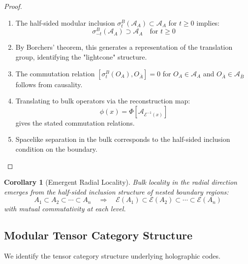 \documentclass[12pt,a4paper]{article}
\newtheorem{corollary}[theorem]{Corollary}
\begin{document}
\begin{proof}
\begin{enumerate}
    \item The half-sided modular inclusion $\sigma_t^B(\mathcal{A}_A) \subset \mathcal{A}_A$ for $t \geq 0$ implies:
    \begin{equation}
    \sigma_{-t}^B(\mathcal{A}_A) \supset \mathcal{A}_A \quad \text{for } t \geq 0
    \end{equation}
    
    \item By Borchers' theorem, this generates a representation of the translation group, identifying the "lightcone" structure.
    
    \item The commutation relation $[\sigma_t^B(O_A), O_{\bar{A}}] = 0$ for $O_A \in \mathcal{A}_A$ and $O_{\bar{A}} \in \mathcal{A}_{\bar{B}}$ follows from causality.
    
    \item Translating to bulk operators via the reconstruction map:
    \begin{equation}
    \phi(x) = \Phi[\mathcal{A}_{\mathcal{E}^{-1}(x)}]
    \end{equation}
    gives the stated commutation relations.
    
    \item Spacelike separation in the bulk corresponds to the half-sided inclusion condition on the boundary.
\end{enumerate}
\end{proof}

\begin{corollary}[Emergent Radial Locality]
Bulk locality in the radial direction emerges from the half-sided inclusion structure of nested boundary regions:
\begin{equation}
A_1 \subset A_2 \subset \cdots \subset A_n \quad \Rightarrow \quad \mathcal{E}(A_1) \subset \mathcal{E}(A_2) \subset \cdots \subset \mathcal{E}(A_n)
\end{equation}
with mutual commutativity at each level.
\end{corollary}

\subsection{Modular Tensor Category Structure}

We identify the tensor category structure underlying holographic codes.
\end{document}
